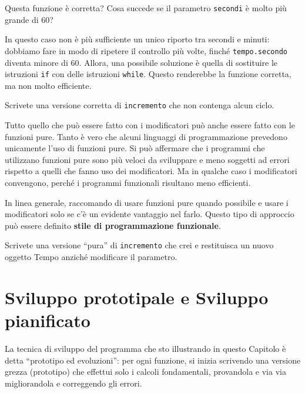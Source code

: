 \documentclass[10pt]{book}
\begin{document}
Questa funzione è corretta? Cosa succede se il parametro {\tt secondi}
è molto più grande di 60?  

In questo caso non è più sufficiente un unico riporto tra secondi e minuti: dobbiamo fare in modo di ripetere il controllo più volte, finché {\tt tempo.secondo} diventa minore di 60. Allora, una possibile soluzione è quella di sostituire le istruzioni {\tt if} con delle istruzioni {\tt while}.
Questo renderebbe la funzione corretta, ma non molto efficiente.

\vspace{0.2in}
\begin{exercise}

Scrivete una versione corretta di {\tt incremento} che non contenga alcun ciclo.

\end{exercise}

Tutto quello che può essere fatto con i modificatori può anche essere fatto con le funzioni pure. Tanto è vero che alcuni linguaggi di programmazione prevedono unicamente l'uso di funzioni pure. Si può affermare che i programmi che utilizzano funzioni pure sono più veloci da sviluppare e meno soggetti ad errori rispetto a quelli che fanno uso dei modificatori. Ma in qualche caso i modificatori convengono, perché i programmi funzionali risultano meno efficienti.

In linea generale, raccomando di usare funzioni pure quando possibile e usare i modificatori solo se c'è un evidente vantaggio nel farlo. Questo tipo di approccio può essere definito {\bf stile di programmazione funzionale}.

\vspace{0.2in}
\begin{exercise}

Scrivete una versione ``pura'' di {\tt incremento} che crei e restituisca un nuovo oggetto Tempo anziché modificare il parametro.

\end{exercise}


\section{Sviluppo prototipale e Sviluppo pianificato}
\label{prototype}

La tecnica di sviluppo del programma che sto illustrando in questo Capitolo è detta ``prototipo ed evoluzioni'': per ogni funzione, si inizia scrivendo una versione grezza (prototipo) che effettui solo i calcoli fondamentali, provandola e via via migliorandola e correggendo gli errori.
\end{document}
